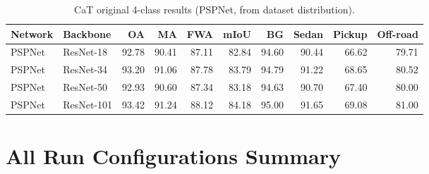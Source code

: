 \documentclass[12pt,a4paper]{report}
\begin{document}
\begin{table}[H]
\centering
\caption{CaT original 4-class results (PSPNet, from dataset distribution).}
\label{tab:cat_original}
\small
\begin{tabular}{@{}ll rrrr rrrr@{}}
\toprule
\textbf{Network} & \textbf{Backbone} & \textbf{OA} & \textbf{MA} & \textbf{FWA} & \textbf{mIoU} & \textbf{BG} & \textbf{Sedan} & \textbf{Pickup} & \textbf{Off-road} \\
\midrule
PSPNet & ResNet-18  & 92.78 & 90.41 & 87.11 & 82.84 & 94.60 & 90.44 & 66.62 & 79.71 \\
PSPNet & ResNet-34  & 93.20 & 91.06 & 87.78 & 83.79 & 94.79 & 91.22 & 68.65 & 80.52 \\
PSPNet & ResNet-50  & 92.93 & 90.60 & 87.34 & 83.18 & 94.63 & 90.70 & 67.40 & 80.00 \\
PSPNet & ResNet-101 & 93.42 & 91.24 & 88.12 & 84.18 & 95.00 & 91.65 & 69.08 & 81.00 \\
\bottomrule
\end{tabular}
\end{table}


\chapter{All Run Configurations Summary}
\label{app:all_configs}
\end{document}
